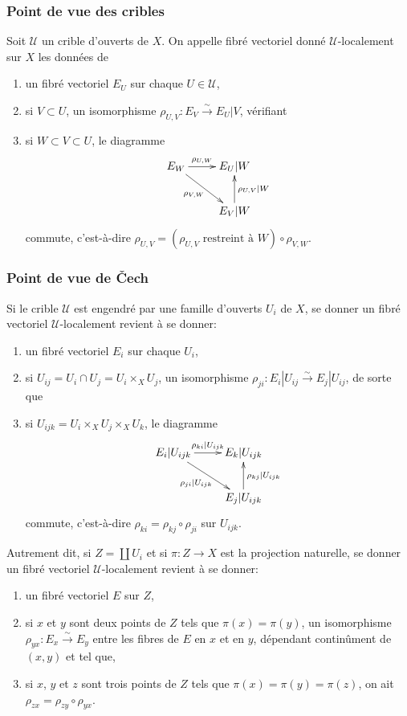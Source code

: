 \documentclass{book}
\newcommand{\sU}{\mathscr{U}}
\newcommand{\iso}{\xrightarrow\sim}
\begin{document}
\subsubsection{Point de vue des cribles}\label{I:1-3-1}

Soit $\sU$ un crible d'ouverts de $X$. On appelle fibré vectoriel donné 
$\sU$-localement sur $X$ les données de 
\begin{enumerate}[\indent a)]
  \item un fibré vectoriel $E_U$ sur chaque $U\in \sU$, 
  \item si $V\subset U$, un isomorphisme $\rho_{U,V} : E_V\iso E_U|V$, vérifiant 
  \item si $W\subset V\subset U$, le diagramme 
    \[\xymatrix{
      E_W \ar[r]^-{\rho_{U,W}} \ar[dr]_-{\rho_{V,W}}
        & E_U|W \\
      & E_V|W \ar[u]_-{\rho_{U,V}|W}
    }\]
    commute, c'est-à-dire 
    $\rho_{U,V} = (\mbox{$\rho_{U,V}$ restreint à $W$}) \circ \rho_{V,W}$. 
\end{enumerate}





\subsubsection{Point de vue de Čech}\label{I:1-3-2}

Si le crible $\sU$ est engendré par une famille d'ouverts $U_i$ de $X$, se 
donner un fibré vectoriel $\sU$-localement revient à se donner:
\begin{enumerate}[\indent a)]
  \item un fibré vectoriel $E_i$ sur chaque $U_i$, 
  \item si $U_{ij} = U_i\cap U_j = U_i\times_X U_j$, un isomorphisme 
    $\rho_{ji} : E_i|U_{ij} \iso E_j|U_{ij}$, de sorte que 
  \item si $U_{ijk} = U_i\times_X U_j\times_X U_k$, le diagramme 
    \[\xymatrix{
      E_i |U_{ijk} \ar[r]^-{\rho_{ki}|U_{ijk}} \ar[dr]_-{\rho_{ji}|U_{ijk}} 
        & E_k|U_{ijk} \\
      & E_j|U_{ijk} \ar[u]_-{\rho_{kj}|U_{ijk}}
    }\]
    commute, c'est-à-dire $\rho_{ki} = \rho_{kj}\circ \rho_{ji}$ sur 
    $U_{ijk}$. 
\end{enumerate}

Autrement dit, si $Z=\coprod U_i$ et si $\pi:Z\to X$ est la projection 
naturelle, se donner un fibré vectoriel $\sU$-localement revient à se donner: 
\begin{enumerate}[\indent a)]
  \item un fibré vectoriel $E$ sur $Z$, 
  \item si $x$ et $y$ sont deux points de $Z$ tels que $\pi(x) = \pi(y)$, un 
    isomorphisme $\rho_{y x}:E_x\iso E_y$ entre les fibres de $E$ en $x$ et en 
    $y$, dépendant continûment de $(x,y)$ et tel que, 
  \item si $x$, $y$ et $z$ sont trois points de $Z$ tels que 
  $\pi(x)=\pi(y)=\pi(z)$, on ait $\rho_{zx} = \rho_{zy}\circ \rho_{yx}$. 
\end{enumerate}
\end{document}
